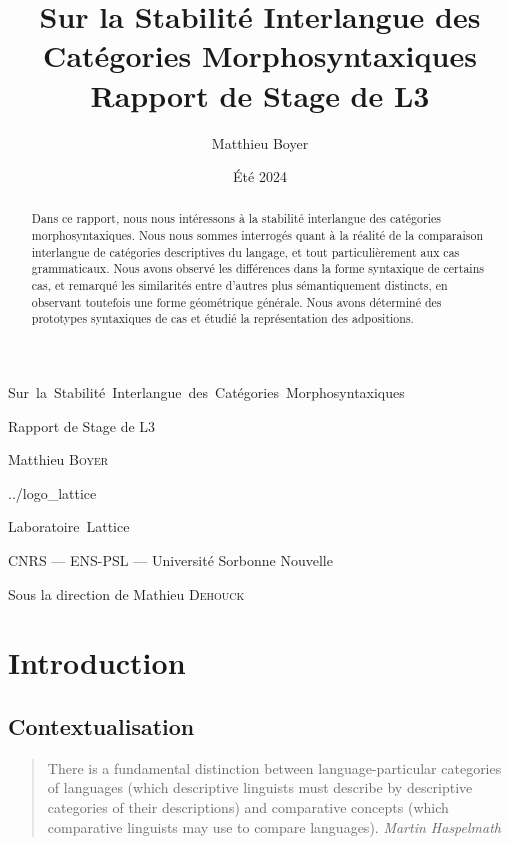 \documentclass{cours}
\title{Sur la Stabilité Interlangue des Catégories Morphosyntaxiques\\[2pt]\small Rapport de Stage de L3}
\author{Matthieu Boyer}
\date{Été 2024}
\begin{document}
\titlepage %
	{}
        {\centering %
		{\Huge Sur\, la\, Stabilité\, Interlangue\, des\, Catégories\, Morphosyntaxiques\par}
                \vspace{16pt}
                {\Large Rapport de Stage de L3\par}
                \vspace{24pt}
                {\huge Matthieu \textsc{Boyer}\par}}
	{../logo_lattice}
	{\centering %
                {\huge\sc Laboratoire\, Lattice \par}
                \vspace{16pt}
                {\large \sc CNRS --- ENS-PSL --- Université Sorbonne Nouvelle\par}
                \vspace{24pt}
		{\Large Sous la direction de Mathieu \textsc{Dehouck}\par}}

\tableofcontents

\begin{abstract}
Dans ce rapport, nous nous intéressons à la stabilité interlangue des catégories morphosyntaxiques.
Nous nous sommes interrogés quant à la réalité de la comparaison interlangue de catégories descriptives du langage, et tout particulièrement aux cas grammaticaux.
Nous avons observé les différences dans la forme syntaxique de certains cas, et remarqué les similarités entre d'autres plus sémantiquement distincts, en observant toutefois une forme géométrique générale.
Nous avons déterminé des prototypes syntaxiques de cas et étudié la représentation des adpositions.
\end{abstract}


\section{Introduction}\label{sec:introduction}
\subsection{Contextualisation}\label{subsec:contextualisation}
\begin{quote}
	There is a fundamental distinction between language-particular categories of languages (which descriptive linguists must describe by descriptive categories of their descriptions) and comparative concepts (which comparative linguists may use to compare languages).
	{\flushright \textit{Martin Haspelmath} \cite{Has18}}
\end{quote}
\end{document}
